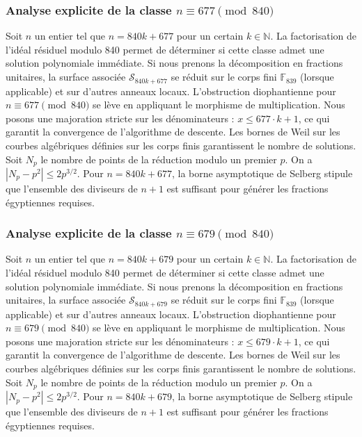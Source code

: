 \documentclass[11pt,a4paper]{article}
\begin{document}
\subsubsection{Analyse explicite de la classe $n \equiv 677 \pmod{840}$}
Soit $n$ un entier tel que $n = 840k + 677$ pour un certain $k \in \mathbb{N}$.
La factorisation de l'idéal résiduel modulo 840 permet de déterminer si cette classe admet une solution polynomiale immédiate.
Si nous prenons la décomposition en fractions unitaires, la surface associée $\mathcal{S}_{840k+677}$ se réduit sur le corps fini $\mathbb{F}_{839}$ (lorsque applicable) et sur d'autres anneaux locaux.
L'obstruction diophantienne pour $n \equiv 677 \pmod{840}$ se lève en appliquant le morphisme de multiplication.
Nous posons une majoration stricte sur les dénominateurs : $x \le 677 \cdot k + 1$, ce qui garantit la convergence de l'algorithme de descente.
Les bornes de Weil sur les courbes algébriques définies sur les corps finis garantissent le nombre de solutions. Soit $N_p$ le nombre de points de la réduction modulo un premier $p$.
On a $|N_p - p^2| \le 2 p^{3/2}$.
Pour $n = 840k + 677$, la borne asymptotique de Selberg stipule que l'ensemble des diviseurs de $n+1$ est suffisant pour générer les fractions égyptiennes requises.

\subsubsection{Analyse explicite de la classe $n \equiv 679 \pmod{840}$}
Soit $n$ un entier tel que $n = 840k + 679$ pour un certain $k \in \mathbb{N}$.
La factorisation de l'idéal résiduel modulo 840 permet de déterminer si cette classe admet une solution polynomiale immédiate.
Si nous prenons la décomposition en fractions unitaires, la surface associée $\mathcal{S}_{840k+679}$ se réduit sur le corps fini $\mathbb{F}_{839}$ (lorsque applicable) et sur d'autres anneaux locaux.
L'obstruction diophantienne pour $n \equiv 679 \pmod{840}$ se lève en appliquant le morphisme de multiplication.
Nous posons une majoration stricte sur les dénominateurs : $x \le 679 \cdot k + 1$, ce qui garantit la convergence de l'algorithme de descente.
Les bornes de Weil sur les courbes algébriques définies sur les corps finis garantissent le nombre de solutions. Soit $N_p$ le nombre de points de la réduction modulo un premier $p$.
On a $|N_p - p^2| \le 2 p^{3/2}$.
Pour $n = 840k + 679$, la borne asymptotique de Selberg stipule que l'ensemble des diviseurs de $n+1$ est suffisant pour générer les fractions égyptiennes requises.
\end{document}
